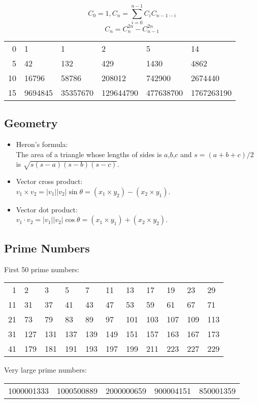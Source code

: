 \documentclass[twocolumn]{article}
\begin{document}
$$C_0=1, C_n=\sum_{i=0}^{n-1} C_i C_{n-1-i}$$
$$C_n=C_n^{2n}-C_{n-1}^{2n}$$

\begin{tabular}{r|lllll}
    0 & 1 & 1 & 2 & 5 & 14 \\
    5 & 42 & 132 & 429 & 1430 & 4862 \\
    10 & 16796 & 58786 & 208012 & 742900 & 2674440 \\
    15 & 9694845 & 35357670 & 129644790 & 477638700 & 1767263190
\end{tabular}

\subsection{Geometry}

\begin{itemize}
    \item Heron's formula:\\ The area of a triangle whose lengths of sides is $a$,$b$,$c$ and $s = (a + b + c) / 2$ is $\sqrt{s(s-a)(s-b)(s-c)}$.
    \item Vector cross product:\\ $v_1 \times v_2 = |v_1||v_2| \sin \theta = (x_1 \times y_2) - (x_2 \times y_1)$.
    \item Vector dot product:\\ $v_1 \cdot v_2 = |v_1||v_2| \cos \theta = (x_1 \times y_1) + (x_2 \times y_2)$.
\end{itemize}

\subsection{Prime Numbers}

First 50 prime numbers:\\
\begin{tabular}{r|llllllllll}
    1 & 2 & 3 & 5 & 7 & 11 & 13 & 17 & 19 & 23 & 29\\
    11 & 31 & 37 & 41 & 43 & 47 & 53 & 59 & 61 & 67 & 71\\
    21 & 73 & 79 & 83 & 89 & 97 & 101 & 103 & 107 & 109 & 113\\
    31 & 127 & 131 & 137 & 139 & 149 & 151 & 157 & 163 & 167 & 173\\
    41 & 179 & 181 & 191 & 193 & 197 & 199 & 211 & 223 & 227 & 229
\end{tabular}

Very large prime numbers:\\
\begin{tabular}{ccccc}
    1000001333 & 1000500889 & 2000000659 & 900004151 & 850001359
\end{tabular}
\end{document}
